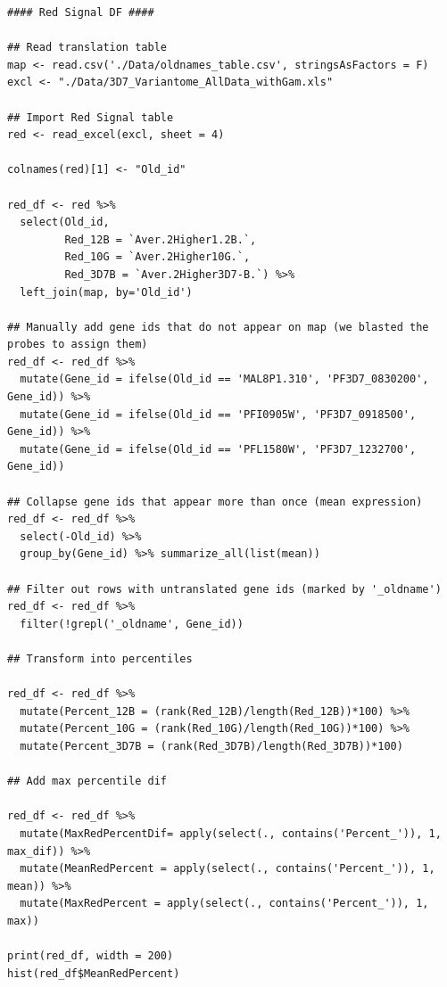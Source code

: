 \documentclass[11pt]{article}
\begin{document}
\begin{verbatim}
#### Red Signal DF ####

## Read translation table
map <- read.csv('./Data/oldnames_table.csv', stringsAsFactors = F)
excl <- "./Data/3D7_Variantome_AllData_withGam.xls"

## Import Red Signal table
red <- read_excel(excl, sheet = 4)

colnames(red)[1] <- "Old_id"

red_df <- red %>%
  select(Old_id,
         Red_12B = `Aver.2Higher1.2B.`,
         Red_10G = `Aver.2Higher10G.`,
         Red_3D7B = `Aver.2Higher3D7-B.`) %>%
  left_join(map, by='Old_id')

## Manually add gene ids that do not appear on map (we blasted the probes to assign them)
red_df <- red_df %>%
  mutate(Gene_id = ifelse(Old_id == 'MAL8P1.310', 'PF3D7_0830200', Gene_id)) %>%
  mutate(Gene_id = ifelse(Old_id == 'PFI0905W', 'PF3D7_0918500', Gene_id)) %>%
  mutate(Gene_id = ifelse(Old_id == 'PFL1580W', 'PF3D7_1232700', Gene_id))

## Collapse gene ids that appear more than once (mean expression)
red_df <- red_df %>%
  select(-Old_id) %>%
  group_by(Gene_id) %>% summarize_all(list(mean))

## Filter out rows with untranslated gene ids (marked by '_oldname')
red_df <- red_df %>%
  filter(!grepl('_oldname', Gene_id))

## Transform into percentiles

red_df <- red_df %>%
  mutate(Percent_12B = (rank(Red_12B)/length(Red_12B))*100) %>%
  mutate(Percent_10G = (rank(Red_10G)/length(Red_10G))*100) %>%
  mutate(Percent_3D7B = (rank(Red_3D7B)/length(Red_3D7B))*100)

## Add max percentile dif

red_df <- red_df %>%
  mutate(MaxRedPercentDif= apply(select(., contains('Percent_')), 1, max_dif)) %>%
  mutate(MeanRedPercent = apply(select(., contains('Percent_')), 1, mean)) %>%
  mutate(MaxRedPercent = apply(select(., contains('Percent_')), 1, max))

print(red_df, width = 200)
hist(red_df$MeanRedPercent)
\end{verbatim}
\end{document}
